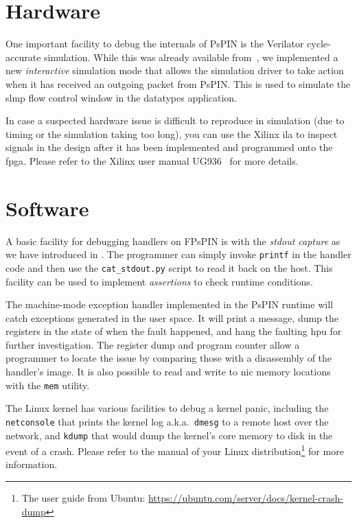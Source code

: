 \section{Hardware}

One important facility to debug the internals of PsPIN is the Verilator cycle-accurate simulation.  While this was already available from~\cite{di_girolamo_pspin_2021}, we implemented a new \emph{interactive} simulation mode that allows the simulation driver to take action when it has received an outgoing packet from PsPIN.  This is used to simulate the \ac{slmp} flow control window in the datatypes application.

In case a suspected hardware issue is difficult to reproduce in simulation (due to timing or the simulation taking too long), you can use the Xilinx \ac{ila} to inspect signals in the design after it has been implemented and programmed onto the \ac{fpga}.  Please refer to the Xilinx user manual UG936~\cite{noauthor_vivado_2020} for more details.

\section{Software}

A basic facility for debugging handlers on FPsPIN is with the \emph{stdout capture} as we have introduced in .  The programmer can simply invoke \texttt{printf} in the handler code and then use the \texttt{cat\_stdout.py} script to read it back on the host.  This facility can be used to implement \emph{assertions} to check runtime conditions.

The machine-mode exception handler implemented in the PsPIN runtime will catch exceptions generated in the user space.  It will print a message, dump the registers in the state of when the fault happened, and hang the faulting \ac{hpu} for further investigation.  The register dump and program counter allow a programmer to locate the issue by comparing those with a disassembly of the handler's image.  It is also possible to read and write to \ac{nic} memory locations with the \texttt{mem} utility.

The Linux kernel has various facilities to debug a kernel panic, including the \texttt{netconsole} that prints the kernel log a.k.a.\ \texttt{dmesg} to a remote host over the network, and \texttt{kdump} that would dump the kernel's core memory to disk in the event of a crash.  Please refer to the manual of your Linux distribution\footnote{The user guide from Ubuntu: \url{https://ubuntu.com/server/docs/kernel-crash-dump}} for more information.

